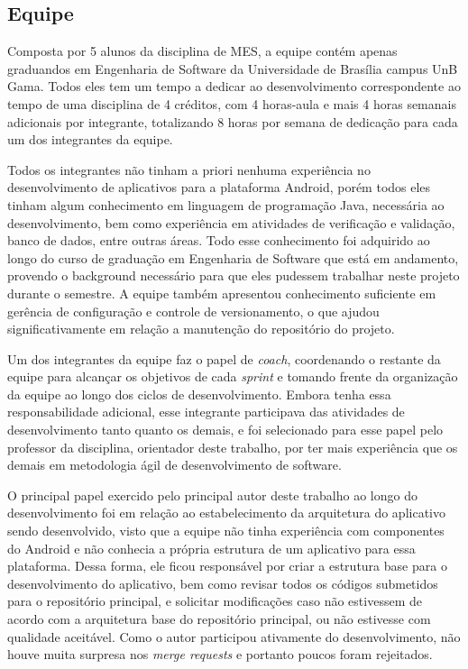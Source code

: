 \subsection{Equipe}
Composta por 5 alunos da disciplina de MES, a equipe contém apenas graduandos em Engenharia de Software da Universidade de Brasília campus UnB Gama. Todos eles tem um tempo a dedicar ao desenvolvimento correspondente ao tempo de uma disciplina de 4 créditos, com 4 horas-aula e mais 4 horas semanais adicionais por integrante, totalizando 8 horas por semana de dedicação para cada um dos integrantes da equipe.

Todos os integrantes não tinham a priori nenhuma experiência no desenvolvimento de aplicativos para a plataforma Android, porém todos eles tinham algum conhecimento em linguagem de programação Java, necessária ao desenvolvimento, bem como experiência em atividades de verificação e validação, banco de dados, entre outras áreas. Todo esse conhecimento foi adquirido ao longo do curso de graduação em Engenharia de Software que está em andamento, provendo o background necessário para que eles pudessem trabalhar neste projeto durante o semestre. A equipe também apresentou conhecimento suficiente em gerência de configuração e controle de versionamento, o que ajudou significativamente em relação a manutenção do repositório do projeto.

Um dos integrantes da equipe faz o papel de \textit{coach}, coordenando o restante da equipe para alcançar os objetivos de cada \textit{sprint} e tomando frente da organização da equipe ao longo dos ciclos de desenvolvimento. Embora tenha essa responsabilidade adicional, esse integrante participava das atividades de desenvolvimento tanto quanto os demais, e foi selecionado para esse papel pelo professor da disciplina, orientador deste trabalho, por ter mais experiência que os demais em metodologia ágil de desenvolvimento de software.

O principal papel exercido pelo principal autor deste trabalho ao longo do desenvolvimento foi em relação ao estabelecimento da arquitetura do aplicativo sendo desenvolvido, visto que a equipe não tinha experiência com componentes do Android e não conhecia a própria estrutura de um aplicativo para essa plataforma. Dessa forma, ele ficou responsável por criar a estrutura base para o desenvolvimento do aplicativo, bem como revisar todos os códigos submetidos para o repositório principal, e solicitar modificações caso não estivessem de acordo com a arquitetura base do repositório principal, ou não estivesse com qualidade aceitável. Como o autor participou ativamente do desenvolvimento, não houve muita surpresa nos \textit{merge requests} e portanto poucos foram rejeitados.


